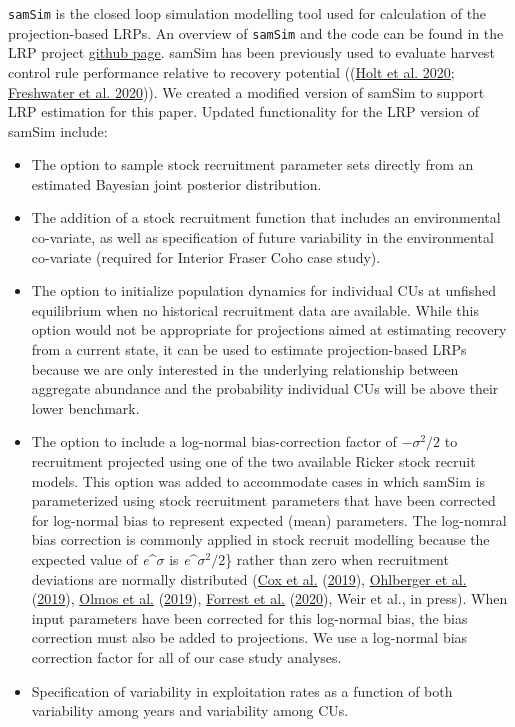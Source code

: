 \documentclass[11pt]{book}
\begin{document}
\texttt{samSim} is the closed loop simulation modelling tool used for calculation of the projection-based LRPs. An overview of \texttt{samSim} and the code can be found in the LRP project \href{https://github.com/Pacific-salmon-assess/samSim/tree/LRP}{github page}. samSim has been previously used to evaluate harvest control rule performance relative to recovery potential ((\protect\hyperlink{ref-holtQuantitativeToolEvaluating2020}{Holt et al. 2020}; \protect\hyperlink{ref-freshwaterBenefitsLimitationsIncreasing2020}{Freshwater et al. 2020})). We created a modified version of samSim to support LRP estimation for this paper. Updated functionality for the LRP version of samSim include:
\begin{itemize}
\item
  The option to sample stock recruitment parameter sets directly from an estimated Bayesian joint posterior distribution.
\item
  The addition of a stock recruitment function that includes an environmental co-variate, as well as specification of future variability in the environmental co-variate (required for Interior Fraser Coho case study).
\item
  The option to initialize population dynamics for individual CUs at unfished equilibrium when no historical recruitment data are available. While this option would not be appropriate for projections aimed at estimating recovery from a current state, it can be used to estimate projection-based LRPs because we are only interested in the underlying relationship between aggregate abundance and the probability individual CUs will be above their lower benchmark.
\item
  The option to include a log-normal bias-correction factor of \(-\sigma^2 / 2\) to recruitment projected using one of the two available Ricker stock recruit models. This option was added to accommodate cases in which samSim is parameterized using stock recruitment parameters that have been corrected for log-normal bias to represent expected (mean) parameters. The log-nomral bias correction is commonly applied in stock recruit modelling because the expected value of \emph{e}\^{}\(\sigma\) is \emph{e}\^{}\(\sigma^2 / 2\)\} rather than zero when recruitment deviations are normally distributed (\protect\hyperlink{ref-coxCandidateLimitReference2019}{Cox et al.} (\protect\hyperlink{ref-coxCandidateLimitReference2019}{2019}), \protect\hyperlink{ref-ohlbergerBayesianLifecycleModel2019}{Ohlberger et al.} (\protect\hyperlink{ref-ohlbergerBayesianLifecycleModel2019}{2019}), \protect\hyperlink{ref-olmosEvidenceSpatialCoherence2019}{Olmos et al.} (\protect\hyperlink{ref-olmosEvidenceSpatialCoherence2019}{2019}), \protect\hyperlink{ref-forrestAssessmentPacificCod2020}{Forrest et al.} (\protect\hyperlink{ref-forrestAssessmentPacificCod2020}{2020}), Weir et al., in press). When input parameters have been corrected for this log-normal bias, the bias correction must also be added to projections. We use a log-normal bias correction factor for all of our case study analyses.
\item
  Specification of variability in exploitation rates as a function of both variability among years and variability among CUs.
\end{itemize}
\end{document}
